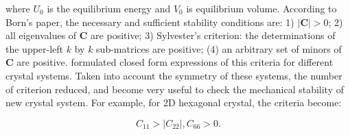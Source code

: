 where $U_0$ is the equilibrium energy and $V_0$ is equilibrium volume. According to Born's paper\cite{born_1940}, the necessary and sufficient stability conditions are: 1) $|\mathbf{C}|>0$; 2) all eigenvalues of $\mathbf{C}$ are positive; 3) Sylvester’s criterion: the determinations of the upper-left $k$ by $k$ sub-matrices are positive; (4) an arbitrary set of minors of $\mathbf{C}$ are positive. \citet{Mouhat2014} formulated closed form expressions of this criteria for different crystal systems. Taken into account the symmetry of these systems, the number of criterion reduced, and become very useful to check the mechanical stability of new crystal system. For example, for 2D hexagonal crystal, the criteria become:

\begin{equation}
C_{11}>|C_{22}|,C_{66}>0.
\end{equation}